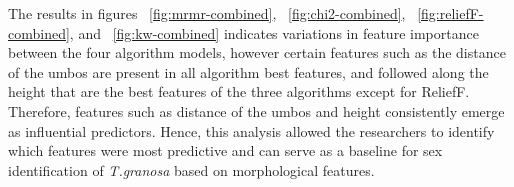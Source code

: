 The results in figures ~\ref{fig:mrmr-combined},  ~\ref{fig:chi2-combined},  ~\ref{fig:reliefF-combined}, and ~\ref{fig:kw-combined} indicates variations in feature importance between the four algorithm models, however certain features such as the distance of the umbos are present in all algorithm best features, and followed along the height that are the best features of the three algorithms except for ReliefF. Therefore, features such as distance of the umbos and height consistently emerge as influential predictors. Hence, this analysis allowed the researchers to identify which features were most predictive and can serve as a baseline for sex identification of \textit{T.granosa} based on morphological features. 




